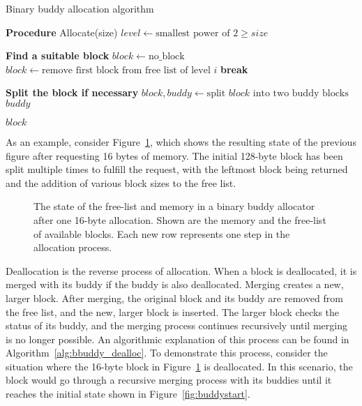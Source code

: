 \begin{algorithm}[h]
    \caption{Binary buddy allocation algorithm}
    \label{alg:bbuddy_alloc}
    \begin{algorithmic}[1]
        \Statex \textbf{Procedure} Allocate(size)
        \State $level \gets \text{smallest power of 2} \geq size$

        \Statex \textbf{Find a suitable block}
        \State $block \gets \text{no\_block}$
        \State $block \gets \text{remove first block from free list of level } i$
        \State \textbf{break}
        \EndIf
        \EndFor

        \State \Return {}
        \EndIf

        \Statex \textbf{Split the block if necessary}
        \State $block, buddy \gets \text{split } block \text{ into two buddy blocks}$
        \State {} $buddy$ 
        \EndWhile

        \State \Return $block$
    \end{algorithmic}
\end{algorithm}

\newpage
As an example, consider Figure~\ref{fig:buddysplit}, which shows the resulting state of the previous figure after requesting 16 bytes of memory. The initial 128-byte block has been split multiple times to fulfill the request, with the leftmost block being returned and the addition of various block sizes to the free list.

\begin{figure}[h]
    \centering
    
    \caption{The state of the free-list and memory in a binary buddy allocator after one 16-byte allocation. Shown are the memory and the free-list of available blocks. Each new row represents one step in the allocation process.}
    \label{fig:buddysplit}
\end{figure}

\FloatBarrier

Deallocation is the reverse process of allocation. When a block is deallocated, it is merged with its buddy if the buddy is also deallocated. Merging creates a new, larger block. After merging, the original block and its buddy are removed from the free list, and the new, larger block is inserted. The larger block checks the status of its buddy, and the merging process continues recursively until merging is no longer possible. An algorithmic explanation of this process can be found in Algorithm~\ref{alg:bbuddy_dealloc}. To demonstrate this process, consider the situation where the 16-byte block in Figure~\ref{fig:buddysplit} is deallocated. In this scenario, the block would go through a recursive merging process with its buddies until it reaches the initial state shown in Figure~\ref{fig:buddystart}.

